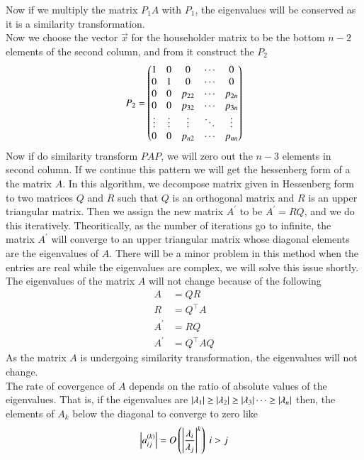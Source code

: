 \documentclass[journal]{IEEEtran}
\begin{document}
Now if we multiply the matrix $P_1A$ with $P_1$, the eigenvalues will be conserved as it is a similarity transformation.\\
Now we choose the vector $\vec{x}$ for the householder matrix to be the bottom $n-2$ elements of the second column, and from it construct the $P_2$
\begin{align}
P_2 = \begin{pmatrix}
1 & 0 & 0 & \cdots & 0 \\
0 & 1 & 0 & \cdots & 0 \\
0 & 0 & p_{22} & \cdots & p_{2n} \\
0 & 0 & p_{32} & \cdots & p_{3n} \\
\vdots & \vdots & \vdots & \ddots & \vdots \\
0 & 0 & p_{n2} & \cdots & p_{nn}
\end{pmatrix}
\end{align}
Now if do similarity transform $PAP$, we will zero out the $n-3$ elements in second column.
If we continue this pattern we will get the hessenberg form of a the matrix $A$.
In this algorithm, we decompose matrix given in Hessenberg form to two matrices $Q$ and $R$ such that $Q$ is an orthogonal matrix and $R$ is an upper triangular matrix. Then we assign the new matrix $A^\prime$ to be $A^\prime = RQ$, and we do this iteratively. Theoritically, as the number of iterations go to infinite, the matrix $A^\prime$ will converge to an upper triangular matrix whose diagonal elements are the eigenvalues of $A$. There will be a minor problem in this method when the entries are real while the eigenvalues are complex, we will solve this issue shortly. The eigenvalues of the matrix $A$ will not change because of the following
\begin{align}
	A &= QR\\
	R &= Q^\top A\\
	A^\prime &= RQ\\
	A^\prime &= Q^\top AQ
\end{align}
As the matrix $A$ is undergoing similarity transformation, the eigenvalues will not change.\\
The rate of covergence of $A$ depends on the ratio of absolute values of the eigenvalues. That is, if the eigenvalues are $\left\vert\lambda_1\right\vert \geq \left\vert\lambda_2\right\vert \geq \left\vert\lambda_3\right\vert \dots \geq \left\vert\lambda_n\right\vert$ then, the elements of $A_k$ below the diagonal to converge to zero like
\begin{align}
    \left\vert a_{ij}^{\left(k\right)}\right\vert = O\left(\left\vert\frac{\lambda_i}{\lambda_j}\right\vert^k\right)\text{    } i > j
\end{align}
\\
\end{document}

